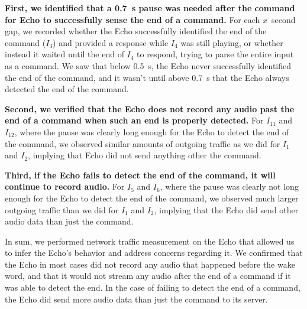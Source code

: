 \textbf{First, we identified that a 0.7~s pause was needed after the command for Echo to successfully sense the end of a command.} For each $x$~second gap, we recorded whether the Echo successfully identified the end of the command ($I_3$) and provided a response while $I_4$ was still playing, or whether instead it waited until the end of $I_4$ to respond, trying to parse the entire input as a command. We saw that below 0.5~s, the Echo never successfully identified the end of the command, and it wasn't until above 0.7~s that the Echo always detected the end of the command.

\textbf{Second, we verified that the Echo does not record any audio past the end of a command when such an end is properly detected.} For $I_{11}$ and $I_{12}$, where the pause was clearly long enough for the Echo to detect the end of the command, we observed similar amounts of outgoing traffic as we did for $I_{1}$ and $I_{2}$, implying that Echo did not send anything other the command.

\textbf{Third, if the Echo fails to detect the end of the command, it will continue to record audio.} For $I_{5}$ and $I_{6}$, where the pause was clearly not long enough for the Echo to detect the end of the command, we observed much larger outgoing traffic than we did for $I_{1}$ and $I_{2}$, implying that the Echo did send other audio data than just the command.

In sum, we performed network traffic measurement on the Echo that allowed us to infer the Echo's behavior and address concerns regarding it. We confirmed that the Echo in most cases did not record any audio that happened before the wake word, and that it would not stream any audio after the end of a command if it was able to detect the end. In the case of failing to detect the end of a command, the Echo did send more audio data than just the command to its server.
